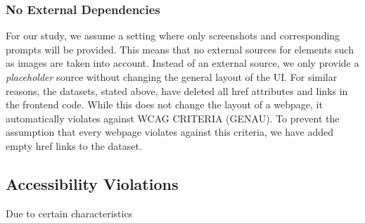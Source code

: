 \subsubsection{No External Dependencies}
For our study, we assume a setting where only screenshots and corresponding 
prompts will be provided. This means that no external sources for elements 
such as images are taken into account. Instead of an external source, we 
only provide a \textit{placeholder} source without changing the general 
layout of the UI. \newline
For similar reasons, the datasets, stated above, have deleted all href 
attributes and links in the frontend code. While this does not change the 
layout of a webpage, it automatically violates against WCAG CRITERIA (GENAU).
To prevent the assumption that every webpage violates against this criteria, 
we have added empty href links to the dataset.


\subsection{Accessibility Violations}
Due to certain characteristics